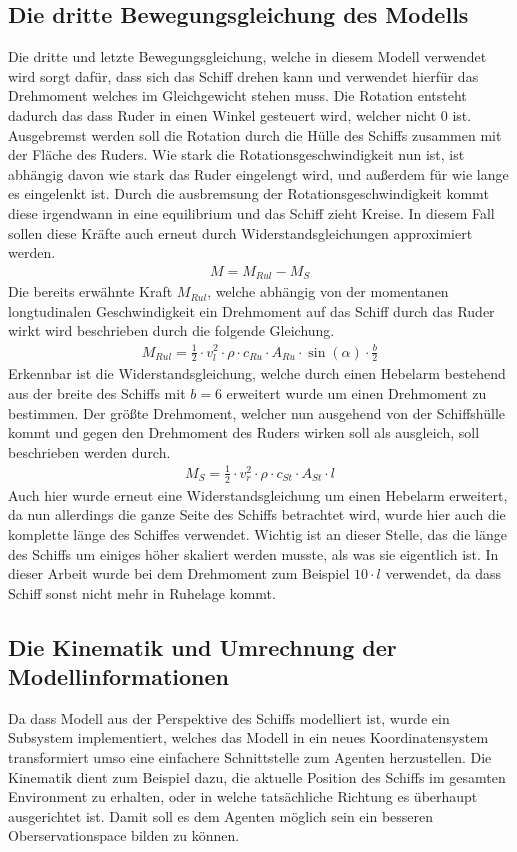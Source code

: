 \documentclass[]{iat}
\begin{document}
\subsection{Die dritte Bewegungsgleichung des Modells} \label{sec:eom3}
Die dritte und letzte Bewegungsgleichung, welche in diesem Modell verwendet wird sorgt dafür, dass sich das Schiff drehen kann und verwendet hierfür das Drehmoment welches im Gleichgewicht stehen muss. Die Rotation entsteht dadurch das dass Ruder in einen Winkel gesteuert wird, welcher nicht 0 ist. Ausgebremst werden soll die Rotation durch die Hülle des Schiffs zusammen mit der Fläche des Ruders. Wie stark die Rotationsgeschwindigkeit nun ist, ist abhängig davon wie stark das Ruder eingelengt wird, und außerdem für wie lange es eingelenkt ist. Durch die ausbremsung der Rotationsgeschwindigkeit kommt diese irgendwann in eine equilibrium und das Schiff zieht Kreise. In diesem Fall sollen diese Kräfte auch erneut durch Widerstandsgleichungen approximiert werden.
\begin{align}
    M = M_{Rul} - M_S
\end{align}
Die bereits erwähnte Kraft $M_{Rul}$, welche abhängig von der momentanen longtudinalen Geschwindigkeit ein Drehmoment auf das Schiff durch das Ruder wirkt wird beschrieben durch die folgende Gleichung.
\begin{align}
    M_{Rul} = \frac{1}{2} \cdot v_l^2 \cdot \rho \cdot c_{Ru} \cdot A_{Ru} \cdot \sin(\alpha) \cdot \frac{b}{2}
\end{align}
Erkennbar ist die Widerstandsgleichung, welche durch einen Hebelarm bestehend aus der breite des Schiffs mit $b = 6$ erweitert wurde um einen Drehmoment zu bestimmen.
Der größte Drehmoment, welcher nun ausgehend von der Schiffshülle kommt und gegen den Drehmoment des Ruders wirken soll als ausgleich, soll beschrieben werden durch.
\begin{align}
    M_S = \frac{1}{2} \cdot v_r^2 \cdot \rho \cdot c_{St} \cdot A_{St} \cdot l
\end{align}
Auch hier wurde erneut eine Widerstandsgleichung um einen Hebelarm erweitert, da nun allerdings die ganze Seite des Schiffs betrachtet wird, wurde hier auch die komplette länge des Schiffes verwendet. Wichtig ist an dieser Stelle, das die länge des Schiffs um einiges höher skaliert werden musste, als was sie eigentlich ist. In dieser Arbeit wurde bei dem Drehmoment zum Beispiel $10 \cdot l$ verwendet, da dass Schiff sonst nicht mehr in Ruhelage kommt.

\subsection{Die Kinematik und Umrechnung der Modellinformationen} \label{sec:kinematik}
Da dass Modell aus der Perspektive des Schiffs modelliert ist, wurde ein Subsystem implementiert, welches das Modell in ein neues Koordinatensystem transformiert umso eine einfachere Schnittstelle zum Agenten herzustellen. Die Kinematik dient zum Beispiel dazu, die aktuelle Position des Schiffs im gesamten Environment zu erhalten, oder in welche tatsächliche Richtung es überhaupt ausgerichtet ist. Damit soll es dem Agenten möglich sein ein besseren Oberservationspace bilden zu können.
\end{document}
